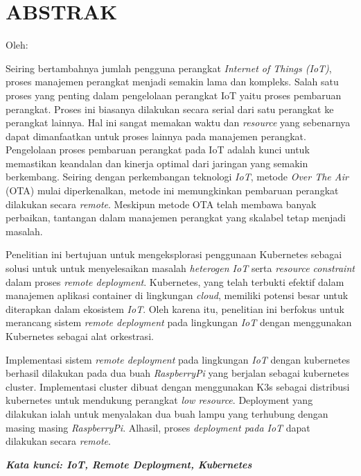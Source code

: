 \clearpage
\chapter*{ABSTRAK}
\begin{center}
  \center
  \begin{singlespace}
    \large\bfseries\MakeUppercase{\thetitle}
    
    \normalfont\normalsize
    Oleh:
    
    \bfseries \theauthor
  \end{singlespace}
\end{center}

\begin{singlespace}
  \small
  Seiring bertambahnya jumlah pengguna perangkat \textit{Internet of Things (IoT)}, proses manajemen perangkat menjadi semakin lama dan kompleks. Salah satu proses yang penting dalam pengelolaan perangkat IoT yaitu proses pembaruan perangkat. Proses ini biasanya dilakukan secara serial dari satu perangkat ke perangkat lainnya. Hal ini sangat memakan waktu dan \textit{resource} yang sebenarnya dapat dimanfaatkan untuk proses lainnya pada manajemen perangkat. Pengelolaan proses pembaruan perangkat pada IoT adalah kunci untuk memastikan keandalan dan kinerja optimal dari jaringan yang semakin berkembang. Seiring dengan perkembangan teknologi \textit{IoT}, metode \textit{Over The Air} (OTA) mulai diperkenalkan, metode ini memungkinkan pembaruan perangkat dilakukan secara \textit{remote}. Meskipun metode OTA telah membawa banyak perbaikan, tantangan dalam manajemen perangkat yang skalabel tetap menjadi masalah.
  
  Penelitian ini bertujuan untuk mengeksplorasi penggunaan Kubernetes sebagai solusi untuk untuk menyelesaikan masalah \textit{heterogen IoT} serta \textit{resource constraint} dalam proses \textit{remote deployment}. Kubernetes, yang telah terbukti efektif dalam manajemen aplikasi container di lingkungan \textit{cloud}, memiliki potensi besar untuk diterapkan dalam ekosistem \textit{IoT}. Oleh karena itu, penelitian ini berfokus untuk merancang sistem \textit{remote deployment} pada lingkungan \textit{IoT} dengan menggunakan Kubernetes sebagai alat orkestrasi.
  
  Implementasi sistem \textit{remote deployment} pada lingkungan \textit{IoT} dengan kubernetes berhasil dilakukan pada dua buah \textit{RaspberryPi} yang berjalan sebagai kubernetes cluster.  Implementasi cluster dibuat dengan menggunakan K3s sebagai distribusi kubernetes untuk mendukung perangkat \textit{low resource}. Deployment yang dilakukan ialah untuk menyalakan dua buah lampu yang terhubung dengan masing masing \textit{RaspberryPi}. Alhasil, proses \textit{deployment pada IoT} dapat dilakukan secara \textit{remote}.
  
  \textbf{\textit{Kata kunci: IoT, Remote Deployment, Kubernetes }}
  
\end{singlespace}
\clearpage
